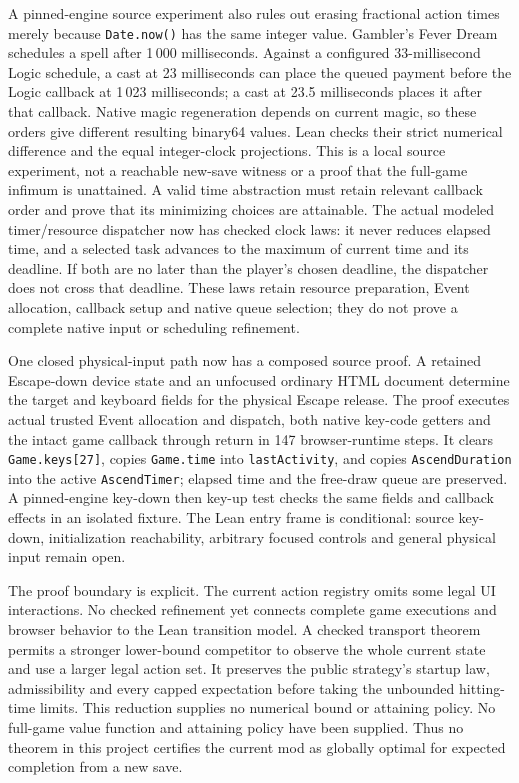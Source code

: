 \documentclass[11pt,a4paper]{article}
\numberwithin{equation}{section}
\theoremstyle{definition}
\theoremstyle{remark}
\begin{document}
A pinned-engine source experiment also rules out erasing fractional action times merely because \texttt{Date.now()} has the same integer value. Gambler's Fever Dream schedules a spell after 1\,000 milliseconds. Against a configured 33-millisecond Logic schedule, a cast at 23 milliseconds can place the queued payment before the Logic callback at 1\,023 milliseconds; a cast at 23.5 milliseconds places it after that callback. Native magic regeneration depends on current magic, so these orders give different resulting binary64 values. Lean checks their strict numerical difference and the equal integer-clock projections. This is a local source experiment, not a reachable new-save witness or a proof that the full-game infimum is unattained. A valid time abstraction must retain relevant callback order and prove that its minimizing choices are attainable. The actual modeled timer/resource dispatcher now has checked clock laws: it never reduces elapsed time, and a selected task advances to the maximum of current time and its deadline. If both are no later than the player's chosen deadline, the dispatcher does not cross that deadline. These laws retain resource preparation, Event allocation, callback setup and native queue selection; they do not prove a complete native input or scheduling refinement.

One closed physical-input path now has a composed source proof. A retained Escape-down device state and an unfocused ordinary HTML document determine the target and keyboard fields for the physical Escape release. The proof executes actual trusted Event allocation and dispatch, both native key-code getters and the intact game callback through return in 147 browser-runtime steps. It clears \texttt{Game.keys[27]}, copies \texttt{Game.time} into \texttt{lastActivity}, and copies \texttt{AscendDuration} into the active \texttt{AscendTimer}; elapsed time and the free-draw queue are preserved. A pinned-engine key-down then key-up test checks the same fields and callback effects in an isolated fixture. The Lean entry frame is conditional: source key-down, initialization reachability, arbitrary focused controls and general physical input remain open.

The proof boundary is explicit. The current action registry omits some legal UI interactions. No checked refinement yet connects complete game executions and browser behavior to the Lean transition model. A checked transport theorem permits a stronger lower-bound competitor to observe the whole current state and use a larger legal action set. It preserves the public strategy's startup law, admissibility and every capped expectation before taking the unbounded hitting-time limits. This reduction supplies no numerical bound or attaining policy. No full-game value function and attaining policy have been supplied. Thus no theorem in this project certifies the current mod as globally optimal for expected completion from a new save.
\end{document}
